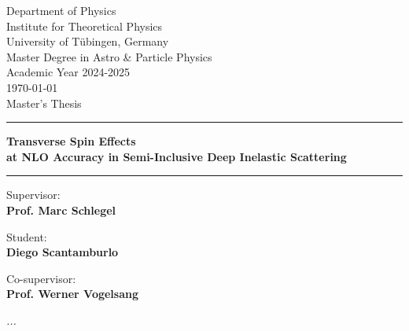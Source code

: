 
\thispagestyle{empty}
    
\begin{center}
   \vspace{1cm}
    \large{Department of Physics\\Institute for Theoretical Physics\\ University of Tübingen, Germany\\
   Master Degree in Astro \& Particle Physics\\
   Academic Year 2024-2025\\
   \today}\\
    \vspace{1.5cm} 
    Master's Thesis 

    \rule{\textwidth}{1pt}
    \begin{minipage}{\textwidth}
        \centering
        
        \vspace{0.8cm}
        \textbf{\huge{Transverse Spin Effects\\ at NLO Accuracy in Semi-Inclusive Deep Inelastic Scattering}}
        \vspace{0.8cm}
        
    \end{minipage}
    \rule{\textwidth}{1pt}
\end{center}

\vspace{20mm}

\noindent
\begin{minipage}[t]{0.45\textwidth} \raggedright 
{\Large Supervisor:\\ {\bf Prof. Marc Schlegel}}
\end{minipage}
\hfill
\begin{minipage}[t]{0.45\textwidth} \raggedleft
{\Large  Student: \\ {\bf Diego Scantamburlo}}
\end{minipage}
\vspace{5mm}

\noindent
\begin{minipage}[t]{0.55\textwidth}\raggedright 
{\Large Co-supervisor:\\ {\bf Prof. Werner Vogelsang}}
\end{minipage}

\vfill


\newpage
\textit{}
\newpage
\vspace{6cm}
\textit{...}
\newpage
\tableofcontents
\clearpage

\setcounter{page}{1} 

